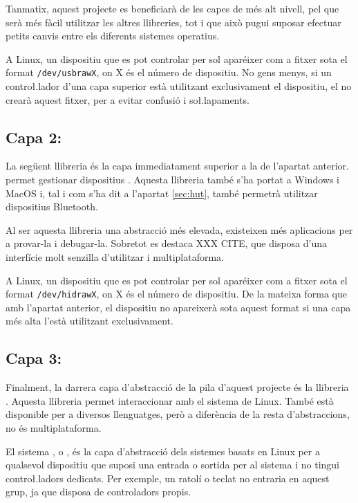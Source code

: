Tanmatix, aquest projecte es beneficiarà de les capes de més alt nivell, pel que
serà més fàcil utilitzar les altres llibreries, tot i que això pugui suposar
efectuar petits canvis entre els diferents sistemes operatius.

A Linux, un dispositiu que es pot controlar per  sol aparéixer com
a fitxer sota el format \verb|/dev/usbrawX|, on X és el número de dispositiu.
No gens menys, si un contro\l.lador d'una capa superior està utilitzant
exclusivament el dispositiu, el  no crearà aquest fitxer, per a
evitar confusió i so\l.lapaments.

\subsection{Capa 2: }

La següent llibreria és la capa immediatament superior a la de l'apartat
anterior.  permet gestionar dispositius . Aquesta
llibreria també s'ha portat a Windows i MacOS i, tal i com s'ha dit a 
l'apartat \ref{sec:hut}, també permetrà utilitzar dispositius Bluetooth.

Al ser aquesta llibreria una abstracció més elevada, existeixen més aplicacions
per a provar-la i debugar-la. Sobretot es destaca XXX CITE, que disposa
d'una interfície molt senzilla d'utilitzar i multiplataforma.

A Linux, un dispositiu que es pot controlar per  sol aparéixer com
a fitxer sota el format \verb|/dev/hidrawX|, on X és el número de dispositiu.
De la mateixa forma que amb l'apartat anterior, el dispositiu no apareixerà
sota aquest format si una capa més alta l'està utilitzant exclusivament.

\subsection{Capa 3: }

Finalment, la darrera capa d'abstracció de la pila d'aquest projecte és la
llibreria .
Aquesta llibreria permet interaccionar amb el sistema
 de Linux. També està disponible per a diversos llenguatges, però
a diferència de la resta d'abstraccions, no és multiplataforma.

El sistema , o , és la capa d'abstracció
dels sistemes basats en Linux per a qualsevol dispositiu que suposi una entrada
o sortida per al sistema i no tingui contro\l.ladors dedicats. Per exemple, un
ratolí o teclat no entraria en aquest grup, ja que disposa de controladors
propis.

